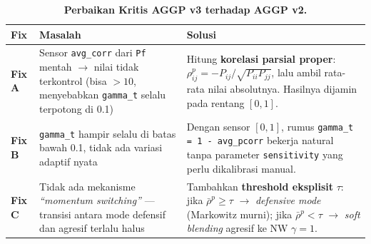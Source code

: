 \documentclass[12pt,a4paper]{article}
\begin{document}
\begin{table}[h]
    \centering
    \footnotesize
    \caption{\textbf{Perbaikan Kritis AGGP v3 terhadap AGGP v2.}}
    \begin{tabular}{p{0.8cm} p{4.5cm} p{8.5cm}}
        \toprule
        \textbf{Fix} & \textbf{Masalah} & \textbf{Solusi} \\
        \midrule
        \textbf{Fix A} &
        Sensor \texttt{avg\_corr} dari \texttt{Pf} mentah $\rightarrow$ nilai tidak terkontrol (bisa $> 10$, menyebabkan \texttt{gamma\_t} selalu terpotong di 0.1) &
        Hitung \textbf{korelasi parsial proper}: $\rho^p_{ij} = {-P_{ij}}/\sqrt{P_{ii} P_{jj}}$, lalu ambil rata-rata nilai absolutnya. Hasilnya dijamin pada rentang $[0, 1]$. \\
        \midrule
        \textbf{Fix B} &
        \texttt{gamma\_t} hampir selalu di batas bawah 0.1, tidak ada variasi adaptif nyata &
        Dengan sensor $[0,1]$, rumus \texttt{gamma\_t = 1 - avg\_pcorr} bekerja natural tanpa parameter \texttt{sensitivity} yang perlu dikalibrasi manual. \\
        \midrule
        \textbf{Fix C} &
        Tidak ada mekanisme \textit{``momentum switching''} --- transisi antara mode defensif dan agresif terlalu halus &
        Tambahkan \textbf{threshold eksplisit} $\tau$: jika $\bar{\rho}^p \geq \tau$ $\rightarrow$ \textit{defensive mode} (Markowitz murni); jika $\bar{\rho}^p < \tau$ $\rightarrow$ \textit{soft blending} agresif ke NW $\gamma = 1$. \\
        \bottomrule
    \end{tabular}
\end{table}
\end{document}

